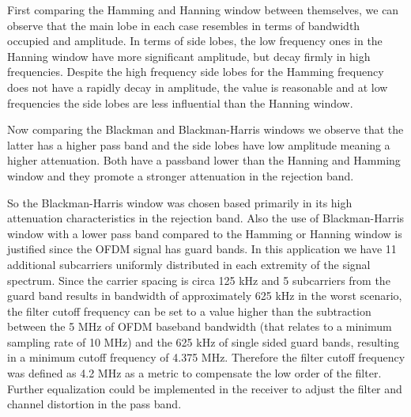 First comparing the Hamming and Hanning window between themselves, we can observe that the main lobe in each case resembles in terms of bandwidth occupied and amplitude. In terms of side lobes, the low frequency ones in the Hanning window have more significant amplitude, but decay firmly in high frequencies. Despite the high frequency side lobes for the Hamming frequency does not have a rapidly decay in amplitude, the value is reasonable and at low frequencies the side lobes are less influential than the Hanning window. 

Now comparing the Blackman and Blackman-Harris windows we observe that the latter has a higher pass band and the side lobes have low amplitude meaning a higher attenuation. Both have a passband lower than the Hanning and Hamming window and they promote a stronger attenuation in the rejection band.

So the Blackman-Harris window was chosen based primarily in its high attenuation characteristics in the rejection band. Also the use of Blackman-Harris window with a lower pass band compared to the Hamming or Hanning window is justified since the OFDM signal has guard bands. In this application we have 11 additional subcarriers uniformly distributed in each extremity of the signal spectrum. Since the carrier spacing is circa 125 kHz and 5 subcarriers from the guard band results in bandwidth of approximately 625 kHz in the worst scenario, the filter cutoff frequency can be set to a value higher than the subtraction between the 5 MHz of OFDM baseband bandwidth (that relates to a minimum sampling rate of 10 MHz) and the 625 kHz of single sided guard bands, resulting in a minimum cutoff frequency of 4.375 MHz. Therefore the filter cutoff frequency was defined as 4.2 MHz as a metric to compensate the low order of the filter. Further equalization could be implemented in the receiver to adjust the filter and channel distortion in the pass band.


